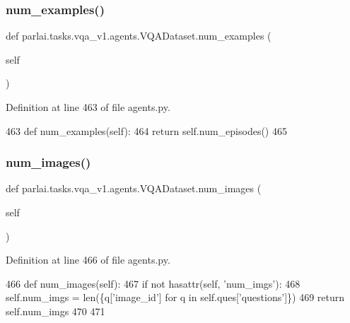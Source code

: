 \subsubsection{\texorpdfstring{num\+\_\+examples()}{num\_examples()}}
{\footnotesize\ttfamily def parlai.\+tasks.\+vqa\+\_\+v1.\+agents.\+V\+Q\+A\+Dataset.\+num\+\_\+examples (\begin{DoxyParamCaption}\item[{}]{self }\end{DoxyParamCaption})}



Definition at line 463 of file agents.\+py.


\begin{DoxyCode}
463     \textcolor{keyword}{def }num\_examples(self):
464         \textcolor{keywordflow}{return} self.num\_episodes()
465 
\end{DoxyCode}
\mbox{\label{classparlai_1_1tasks_1_1vqa__v1_1_1agents_1_1VQADataset_a35425d8a31193d50ad5b1c558322ea93}} 
\subsubsection{\texorpdfstring{num\+\_\+images()}{num\_images()}}
{\footnotesize\ttfamily def parlai.\+tasks.\+vqa\+\_\+v1.\+agents.\+V\+Q\+A\+Dataset.\+num\+\_\+images (\begin{DoxyParamCaption}\item[{}]{self }\end{DoxyParamCaption})}



Definition at line 466 of file agents.\+py.


\begin{DoxyCode}
466     \textcolor{keyword}{def }num\_images(self):
467         \textcolor{keywordflow}{if} \textcolor{keywordflow}{not} hasattr(self, \textcolor{stringliteral}{'num\_imgs'}):
468             self.num\_imgs = len(\{q[\textcolor{stringliteral}{'image\_id'}] \textcolor{keywordflow}{for} q \textcolor{keywordflow}{in} self.ques[\textcolor{stringliteral}{'questions'}]\})
469         \textcolor{keywordflow}{return} self.num\_imgs
470 
471 
\end{DoxyCode}


